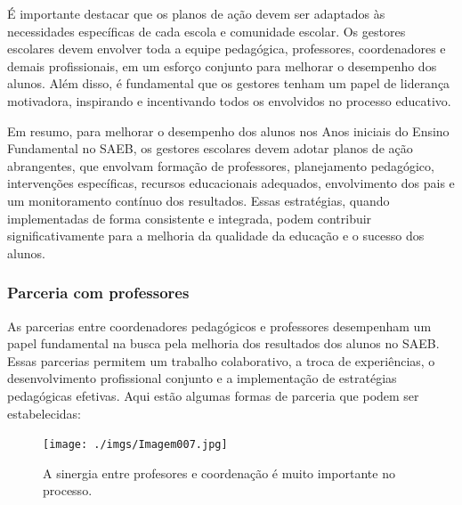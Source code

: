 É importante destacar que os planos de ação devem ser adaptados às
necessidades específicas de cada escola e comunidade escolar. Os
gestores escolares devem envolver toda a equipe pedagógica, professores,
coordenadores e demais profissionais, em um esforço conjunto para
melhorar o desempenho dos alunos. Além disso, é fundamental que os
gestores tenham um papel de liderança motivadora, inspirando e
incentivando todos os envolvidos no processo educativo.

Em resumo, para melhorar o desempenho dos alunos nos Anos iniciais do
Ensino Fundamental no SAEB, os gestores escolares devem adotar planos de
ação abrangentes, que envolvam formação de professores, planejamento
pedagógico, intervenções específicas, recursos educacionais adequados,
envolvimento dos pais e um monitoramento contínuo dos resultados. Essas
estratégias, quando implementadas de forma consistente e integrada,
podem contribuir significativamente para a melhoria da qualidade da
educação e o sucesso dos alunos.

\subsubsection{Parceria com
professores}\label{parceria-com-professores}

As parcerias entre coordenadores pedagógicos e professores desempenham
um papel fundamental na busca pela melhoria dos resultados dos alunos no
SAEB. Essas parcerias permitem um trabalho colaborativo, a troca de
experiências, o desenvolvimento profissional conjunto e a implementação
de estratégias pedagógicas efetivas. Aqui estão algumas formas de
parceria que podem ser estabelecidas:

\begin{figure}
\centering
\texttt{[image: ./imgs/Imagem007.jpg]}
\caption{A sinergia entre profesores e coordenação é muito importante no
processo.}
\end{figure}

